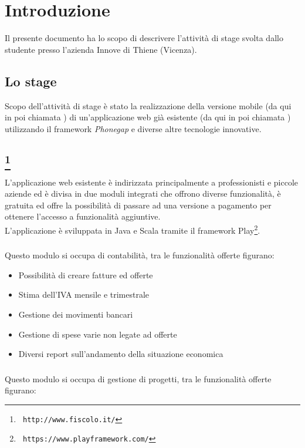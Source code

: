 \section{Introduzione}

Il presente documento ha lo scopo di descrivere l'attività di stage
svolta dallo studente presso l'azienda Innove di Thiene (Vicenza).

\subsection{Lo stage}
Scopo dell'attività di stage è stato la realizzazione della versione
mobile (da qui in poi chiamata \fiscoloMobile) di un'applicazione web 
già esistente (da qui in poi chiamata \fiscoloWeb) utilizzando il
framework \textit{Phonegap} e diverse altre tecnologie innovative.

\subsection[\fiscoloWeb]{\fiscoloWeb\footnote{\texttt{ http://www.fiscolo.it/}}}
L'applicazione web esistente è indirizzata principalmente a professionisti
e piccole aziende ed è divisa in due moduli integrati che offrono diverse 
funzionalità, è gratuita ed offre la possibilità di passare ad una versione
a pagamento per ottenere l'accesso a funzionalità aggiuntive. \\
L'applicazione è sviluppata in Java e Scala tramite il framework
Play\footnote{\texttt{ https://www.playframework.com/}}.

\subsubsection{\fiscolo}
Questo modulo si occupa di contabilità, tra le funzionalità offerte figurano:

\begin{itemize}
\item Possibilità di creare fatture ed offerte
\item Stima dell'IVA mensile e trimestrale
\item Gestione dei movimenti bancari
\item Gestione di spese varie non legate ad offerte
\item Diversi report sull'andamento della situazione economica
\end{itemize}

\subsubsection{\resa}
Questo modulo si occupa di gestione di progetti, tra le funzionalità offerte
figurano:

